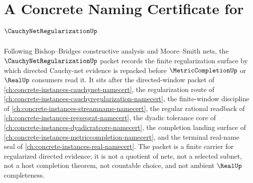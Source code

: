 \chapter{A Concrete Naming Certificate for $\CauchyNetRegularizationUp$}
\label{ch:concrete-instances-cauchy-net-regularization-namecert}

Following Bishop--Bridges constructive analysis and Moore--Smith nets, the $\CauchyNetRegularizationUp$ packet records the finite regularization surface by which directed Cauchy-net evidence is repacked before $\MetricCompletionUp$ or $\RealUp$ consumers read it. It sits after the directed-window packet of \autoref{ch:concrete-instances-cauchynet-namecert}, the regularization route of \autoref{ch:concrete-instances-cauchyregularization-namecert}, the finite-window discipline of \autoref{ch:concrete-instances-streamname-namecert}, the regular rational readback of \autoref{ch:concrete-instances-regseqrat-namecert}, the dyadic tolerance core of \autoref{ch:concrete-instances-dyadicratcore-namecert}, the completion landing surface of \autoref{ch:concrete-instances-metriccompletion-namecert}, and the terminal real-name seal of \autoref{ch:concrete-instances-real-namecert}. The packet is a finite carrier for regularized directed evidence; it is not a quotient of nets, not a selected subnet, not a host completion theorem, not countable choice, and not ambient $\RealUp$ completeness.

